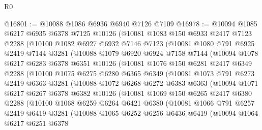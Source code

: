 \begin{lexlean}{R0}
\begin{coremodule}
@16801 := @10088 @1086 @6936 @6940 @7126 @7109
@16978 := @10094
    @1085
    @6217
    @6935
    @6378
    @7125
    @10126
    (@10081
      @1083
      @150
      @6933
      @2417
      @7123
      @2288
      (@10100
        @1082
        @6927
        @6932
        @7146
        @7123
        (@10081
          @1080
          @791
          @6925
          @2419
          @7144
          @3281
          (@10088
            @1079
            @6920
            @6924
            @7158
            @7144
            (@10094
              @1078
              @6217
              @6283
              @6378
              @6351
              @10126
              (@10081
                @1076
                @150
                @6281
                @2417
                @6349
                @2288
                (@10100
                  @1075
                  @6275
                  @6280
                  @6365
                  @6349
                  (@10081
                    @1073
                    @791
                    @6273
                    @2419
                    @6363
                    @3281
                    (@10088
                      @1072
                      @6268
                      @6272
                      @6383
                      @6363
                      (@10094
                        @1071
                        @6217
                        @6267
                        @6378
                        @6382
                        @10126
                        (@10081
                          @1069
                          @150
                          @6265
                          @2417
                          @6380
                          @2288
                          (@10100
                            @1068
                            @6259
                            @6264
                            @6421
                            @6380
                            (@10081
                              @1066
                              @791
                              @6257
                              @2419
                              @6419
                              @3281
                              (@10088
                                @1065
                                @6252
                                @6256
                                @6436
                                @6419
                                (@10094
                                  @1064
                                  @6217
                                  @6251
                                  @6378

\end{coremodule}
\end{lexlean}
